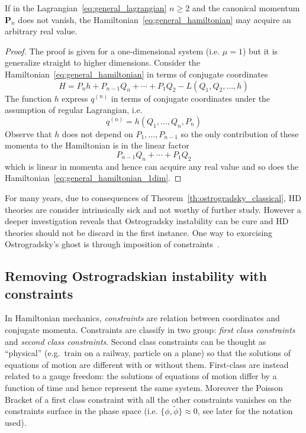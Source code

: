 \begin{theorem}[Ostrogradsky]\label{th:ostrogradsky_classical}
  If in the Lagrangian~\eqref{eq:general_lagrangian} $n \geq 2$ and the
  canonical momentum $\bm{P}_n$ does not vanish, the
  Hamiltonian~\eqref{eq:general_hamiltonian} may acquire an arbitrary real
  value.
\end{theorem}
\begin{proof}
  The proof is given for a one-dimensional system (i.e. $\mu=1$) but it is
  generalize straight to higher dimensions. Consider the
  Hamiltonian~\eqref{eq:general_hamiltonian} in terms of conjugate coordinates
  \begin{equation} \label{eq:general_hamiltonian_1dim}
    H = P_n h + P_{n-1} Q_n + \cdots + P_1 Q_2 - L(Q_1, Q_2, \ldots, h)
  \end{equation}
  The function $h$ express $q^{(n)}$ in terms of conjugate coordinates under
  the assumption of regular Lagrangian, i.e.
  \begin{equation*}
    q^{(n)} = h(Q_1, \ldots, Q_n, P_n)
  \end{equation*}
  Observe that $h$ does not depend on $P_1, \ldots, P_{n-1}$ so the only
  contribution of these momenta to the Hamiltonian is in the linear factor
  \begin{equation*}
    P_{n-1} Q_n + \cdots + P_1 Q_2
  \end{equation*}
  which is linear in momenta and hence can acquire any real value and so does
  the Hamiltonian~\eqref{eq:general_hamiltonian_1dim}.
\end{proof}

For many years, due to consequences of Theorem~\ref{th:ostrogradsky_classical},
HD theories are consider intrinsically sick and not worthy of further study.
However a deeper investigation reveals that Ostrogradsky instability can be cure
and HD theories should not be discard in the first instance. One way to
exorcising Ostrogradsky's ghost is through imposition of
constraints~\cite{Chen13}.


\subsection{Removing Ostrogradskian instability with constraints}

In Hamiltonian mechanics, \emph{constraints} are relation between coordinates
and conjugate momenta. Constraints are classify in two group: \emph{first class
constraints} and \emph{second class constraints}. Second class constraints can
be thought as ``physical'' (e.g.\ train on a railway, particle on a plane) so
that the solutions of equations of motion are different with or without them.
First-class are instead related to a gauge freedom: the solutions of equations
of motion differ by a function of time and hence represent the same system.
Moreover the Poisson Bracket of a first class constraint with all the other
constraints vanishes on the constraints surface in the phase space (i.e.
$\{\phi, \tilde{\phi}\} \approx 0$, see later for the notation used).


